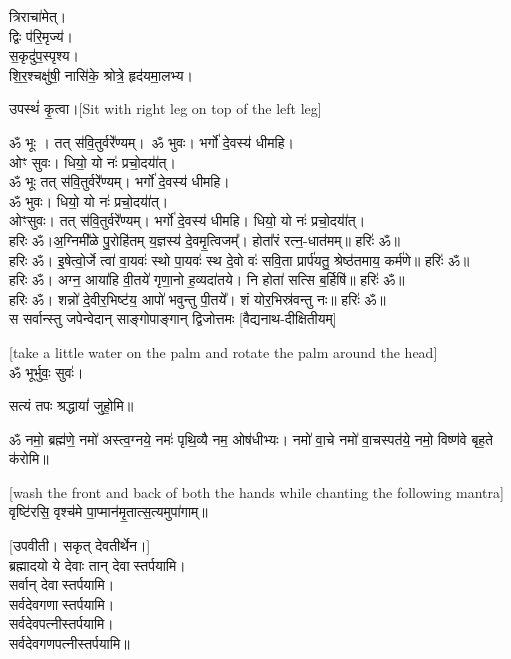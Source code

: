 त्रिराचा॑मेत्।\\
द्विः प॑रि॒मृज्य॑।\\
स॒कृदु॑प॒स्पृश्य।\\
शि॒र॒श्चक्षु॑षी॒ नासि॑के॒ श्रोत्रे॒ हृद॑यमा॒लभ्य।

उपस्थं॑ कृ॒त्वा।{\scriptsize [Sit with right leg on top of the left leg]}

ॐ भूः । तत् स॑वि॒तुर्वरे॑॑ण्यम्।\
ॐ भुवः। भर्गो॑ दे॒वस्य॑ धीमहि।\\
ओꣳ सुवः। धियो॒ यो नः॑ प्रचो॒दया॑॑त्।\\
ॐ भूः तत् स॑वि॒तुर्वरे॑॑ण्यम्। भर्गो॑ दे॒वस्य॑ धीमहि।\\
ॐ भुवः। धियो॒ यो नः॑ प्रचो॒दया॑॑त्।\\
ओꣳसुवः। तत् स॑वि॒तुर्वरे॑॑ण्यम्। भर्गो॑ दे॒वस्य॑ धीमहि। धियो॒ यो नः॑ प्रचो॒दया॑॑त्।\\

हरिः ॐ।अ॒ग्निमी᳚ळे पु॒रोहि॑तम् य॒ज्ञस्य॑ दे॒वमृ॒त्विजम्᳚। होता᳚रं रत्न॒-धात॑मम्॥ हरिः॑ ॐ॥\\

हरिः ॐ। इ॒षेत्वो॒र्जे त्वा॑ वा॒यवः॑ स्थो पा॒यवः॑ स्थ दे॒वो वः॑ सवि॒ता प्रार्प॑यतु॒ श्रेष्ठ॑तमाय॒ कर्म॑णे॥ हरिः॑ ॐ॥ \\

हरिः ॐ। अग्न॒ आया॑हि वी॒तये॑ गृणा॒नो ह॒व्यदा॑तये। नि होता॑ सत्सि ब॒र्हिषि॑॥ हरिः॑ ॐ॥\\

हरिः ॐ। शन्नो॑ दे॒वीर॒भिष्ट॑य॒ आपो॑ भवुन्तु पी॒तये᳚। शं योर॒भिस्र॑वन्तु नः॥ हरिः॑ ॐ॥\\

{\centering
{}
{स सर्वान्स्तु जपेन्वेदान् साङ्गोपाङ्गान् द्विजोत्तमः}
}
{\hfill [वैद्यनाथ-दीक्षितीयम्]}

{\scriptsize [take a little water on the palm and rotate the palm around the head]}\\
ॐ भूर्भुवः॒ सुवः॑।

सत्यं तपः श्रद्धायां॑ जुहो॒मि॥


ॐ नमो॒ ब्रह्म॑णे॒ नमो॑ अस्त्व॒ग्नये॒ नमः॑ पृथि॒व्यै नम॒ ओष॑धीभ्यः।
नमो॑ वा॒चे नमो॑ वा॒चस्पत॑ये॒ नमो॒ विष्ण॑वे बृह॒ते क॑रोमि॥

{\scriptsize [wash the front and back of both the hands while chanting the following mantra]}\\
वृष्टि॑रसि॒ वृश्च॑मे पा॒प्मान॑मृ॒तात्स॒त्यमुपा॑गाम्॥

\vspace{-1ex}
{\scriptsize [उपवीती। सकृत् देवतीर्थेन।]}\\
ब्रह्मादयो ये देवाः तान् देवास्तर्पयामि।\\
सर्वान् देवास्तर्पयामि।\\
सर्वदेवगणास्तर्पयामि।\\
सर्वदेवपत्नीस्तर्पयामि।\\
सर्वदेवगणपत्नीस्तर्पयामि॥

